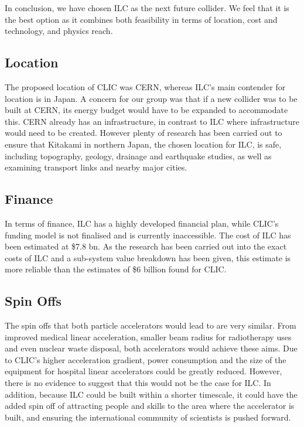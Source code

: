In conclusion, we have chosen ILC as the next future collider. We feel that it is the best option as it combines both feasibility in terms of location, cost and technology, and physics reach.

\subsection{Location}

The proposed location of CLIC was CERN, whereas ILC's main contender for location is in Japan. A concern for our group was that if a new collider was to be built at CERN, its energy budget would have to be expanded to accommodate this. CERN already has an infrastructure, in contrast to ILC where infrastructure would need to be created. However plenty of research has been carried out to ensure that Kitakami in northern Japan, the chosen location for ILC, is safe, including topography, geology, drainage and earthquake studies, as well as examining transport links and nearby major cities.

\subsection{Finance}

In terms of finance, ILC has a highly developed financial plan, while CLIC's funding model is not finalised and is currently inaccessible. The cost of ILC has been estimated at \$7.8 bn. As the research has been carried out into the exact costs of ILC and a sub-system value breakdown has been given, this estimate is more reliable than the estimates of \$6 billion found for CLIC.

\subsection{Spin Offs}

The spin offs that both particle accelerators would lead to are very similar. From improved medical linear acceleration, smaller beam radius for radiotherapy uses and even nuclear waste disposal, both accelerators would achieve these aims. Due to CLIC's higher acceleration gradient, power consumption and the size of the equipment for hospital linear accelerators could be greatly reduced. However, there is no evidence to suggest that this would not be the case for ILC. In addition, because ILC could be built within a shorter timescale, it could have the added spin off of attracting people and skills to the area where the accelerator is built, and ensuring the international community of scientists is pushed forward.

